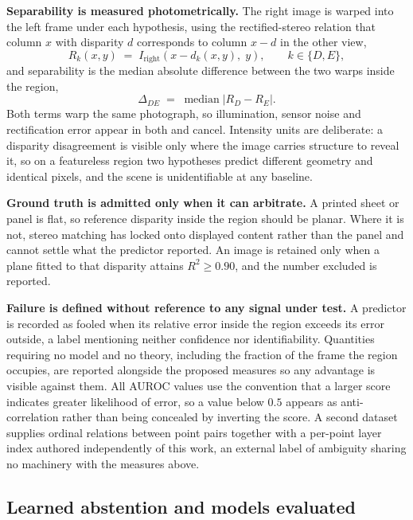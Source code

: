\textbf{Separability is measured photometrically.} The right image is warped into
the left frame under each hypothesis, using the rectified-stereo relation that
column $x$ with disparity $d$ corresponds to column $x - d$ in the other view,
\begin{equation}
\label{eq:warp}
R_{k}(x, y) \;=\; I_{\text{right}}\!\left(x - d_{k}(x,y),\; y\right),
\qquad k \in \{D, E\},
\end{equation}
and separability is the median absolute difference between the two warps inside the
region,
\begin{equation}
\label{eq:delta-photometric}
\Delta_{DE} \;=\; \operatorname{median}\left|R_{D} - R_{E}\right| .
\end{equation}
Both terms warp the same photograph, so illumination, sensor noise and
rectification error appear in both and cancel. Intensity units are deliberate: a
disparity disagreement is visible only where the image carries structure to reveal
it, so on a featureless region two hypotheses predict different geometry and
identical pixels, and the scene is unidentifiable at any baseline.

\textbf{Ground truth is admitted only when it can arbitrate.} A printed sheet or
panel is flat, so reference disparity inside the region should be planar. Where it
is not, stereo matching has locked onto displayed content rather than the panel and
cannot settle what the predictor reported. An image is retained only when a plane
fitted to that disparity attains $R^2 \geq 0.90$, and the number excluded is
reported.

\textbf{Failure is defined without reference to any signal under test.} A predictor
is recorded as fooled when its relative error inside the region exceeds its error
outside, a label mentioning neither confidence nor identifiability. Quantities
requiring no model and no theory, including the fraction of the frame the region
occupies, are reported alongside the proposed measures so any advantage is visible
against them. All AUROC values use the convention that a larger score indicates
greater likelihood of error, so a value below $0.5$ appears as anti-correlation
rather than being concealed by inverting the score. A second dataset supplies
ordinal relations between point pairs together with a per-point layer index
authored independently of this work, an external label of ambiguity sharing no
machinery with the measures above.

\subsection{Learned abstention and models evaluated}
\label{sec:learned}


